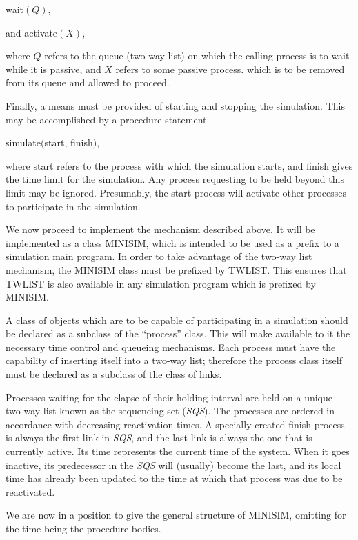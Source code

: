 \quad wait$(Q)$,

\quad and activate$(X)$,

\noindent
where $Q$ refers to the queue (two-way list) on which the calling process is to wait while it is passive, and $X$ refers to some passive process. which is to be removed from its queue and allowed to proceed.

Finally, a means must be provided of starting and stopping the simulation. This may be accomplished by a procedure statement

\quad simulate$($start, finish$)$,

\noindent
where start refers to the process with which the simulation starts, and finish gives the time limit for the simulation. Any process requesting to be held beyond this limit may be ignored. Presumably, the start process will activate other processes to participate in the simulation.

We now proceed to implement the mechanism described above. It will be implemented as a class MINISIM, which is intended to be used as a prefix to a simulation main program. In order to take advantage of the two-way list mechanism, the MINISIM class must be prefixed by TWLIST. This ensures that TWLIST is also available in any simulation program which is prefixed by MINISIM.

A class of objects which are to be capable of participating in a simulation should be declared as a subclass of the ``process'' class. This will make available to it the necessary time control and queueing mechanisms. Each process must have the capability of inserting itself into a two-way list; therefore the process class itself must be declared as a subclass of the class of links.

Processes waiting for the elapse of their holding interval are held on a unique two-way list known as the sequencing set (\textit{SQS}). The processes are ordered in accordance with decreasing reactivation times. A specially created finish process is always the first link in \textit{SQS}, and the last link is always the one that is currently active. Its time represents the current time of the system. When it goes inactive, its predecessor in the \textit{SQS} will (usually) become the last, and its local time has already been updated to the time at which that process was due to be reactivated.

We are now in a position to give the general structure of MINISIM, omitting for the time being the procedure bodies.

